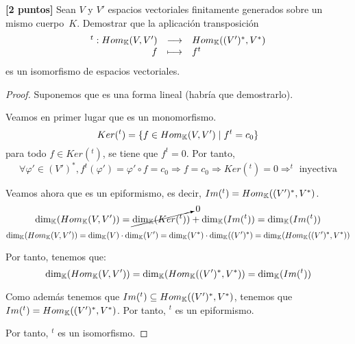 \documentclass[12pt]{article}
\begin{document}
\begin{ejercicio}
    \textbf{[2 puntos]} Sean $V$ y $V'$ espacios vectoriales finitamente generados sobre un mismo cuerpo~$K$. Demostrar que la aplicación transposición
    \begin{equation*}
    \begin{array}{rcl}
        ^t:Hom_{\mathbb{K}}(V,V') & \longrightarrow & Hom_{\mathbb{K}}((V')^\ast,V^\ast)\\
        f & \longmapsto & f^t
    \end{array}
    \end{equation*}
    es un isomorfismo de espacios vectoriales.

    \begin{proof}
        Suponemos que es una forma lineal (habría que demostrarlo).
        
        Veamos en primer lugar que es un monomorfismo.
        \begin{equation*}
            Ker(^t)=\{f\in Hom_{\mathbb{K}}(V,V')\mid f^t=c_0\}
        \end{equation*}
        para todo $f\in Ker(^t)$, se tiene que $f^t=0$. Por tanto,
        \begin{equation*}
            \forall \varphi'\in (V')^\ast, f^t(\varphi')=\varphi'\circ f=c_0 \Longrightarrow f=c_0 \Longrightarrow Ker(^t)=0 \Longrightarrow ^t \text{ inyectiva}
        \end{equation*}

        Veamos ahora que es un epiformismo, es decir, $Im(^t)=Hom_{\mathbb{K}}((V')^\ast,V^\ast)$.
        \begin{equation*}
            \dim_{\mathbb{K}}(Hom_{\mathbb{K}}(V,V')) = \cancelto{0}{\dim_{\mathbb{K}}(Ker(^t))} + \dim_{\mathbb{K}}(Im(^t)) = \dim_{\mathbb{K}}(Im(^t))
        \end{equation*}
        \begin{equation*}
            \dim_{\mathbb{K}}(Hom_{\mathbb{K}}(V,V')) = \dim_{\mathbb{K}}(V)\cdot \dim_{\mathbb{K}}(V') = \dim_{\mathbb{K}}(V^\ast)\cdot \dim_{\mathbb{K}}((V')^\ast) = \dim_{\mathbb{K}}(Hom_{\mathbb{K}}((V')^\ast,V^\ast))
        \end{equation*}

        Por tanto, tenemos que:
        \begin{equation*}
            \dim_{\mathbb{K}}(Hom_{\mathbb{K}}(V,V'))=\dim_{\mathbb{K}}(Hom_{\mathbb{K}}((V')^\ast,V^\ast)) = \dim_{\mathbb{K}}(Im(^t))
        \end{equation*}

        Como además tenemos que $Im(^t)\subseteq Hom_{\mathbb{K}}((V')^\ast,V^\ast)$, tenemos que $Im(^t) = Hom_{\mathbb{K}}((V')^\ast,V^\ast)$. Por tanto, $^t$ es un epiformismo.

        Por tanto, $^t$ es un isomorfismo.
    \end{proof}
\end{ejercicio}
\end{document}
